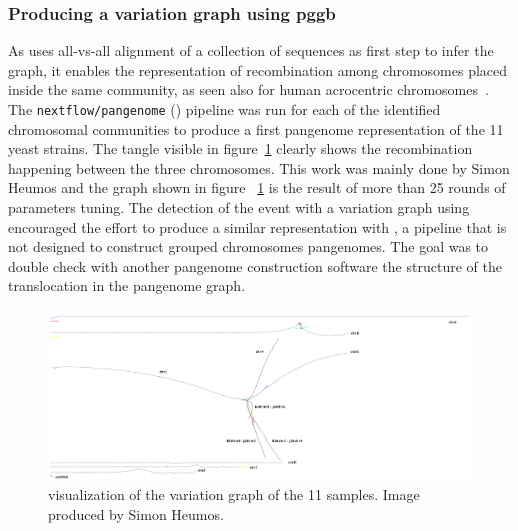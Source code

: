 \subsubsection{Producing a variation graph using pggb}
As \pggb uses all-vs-all alignment of a collection of sequences as first step to infer the graph, it enables the representation of recombination among chromosomes placed inside the same community, as seen also for human acrocentric chromosomes~\cite{Guarracino2023}.\\
The \texttt{nextflow/pangenome} (\pggb) pipeline was run for each of the identified chromosomal communities to produce a first pangenome representation of the 11 yeast strains. The tangle visible in figure~\ref{fig:lodelo_gfaestus} clearly shows the recombination happening between the three chromosomes. This work was mainly done by Simon Heumos and the graph shown in figure ~\ref{fig:lodelo_gfaestus} is the result of more than 25 rounds of parameters tuning.
The detection of the event with a variation graph using \pggb encouraged the effort to produce a similar representation with \mcactus, a pipeline that is not designed to construct grouped chromosomes pangenomes. The goal was to double check with another pangenome construction software the structure of the translocation in the pangenome graph.
\begin{figure}[h!]
	\centering
	\includegraphics[angle=90,width=.6\linewidth]{figures/lodelo/pggb_full.png}
	\caption[\gfaestus visualization of a \lodelo variation graph.]{\gfaestus visualization of the \pggb variation graph of the 11 \lodelo samples. Image produced by Simon Heumos.}
	\label{fig:lodelo_gfaestus}
\end{figure}


